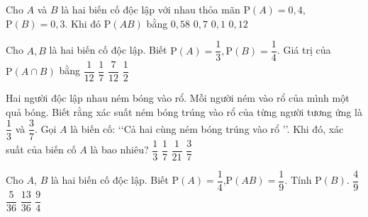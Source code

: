 

\begin{ex}%
	Cho $A$ và $B$ là hai biến cố độc lập với nhau thỏa mãn $\mathrm{P}(A)=0{,}4$,  $\mathrm{P}(B)=0{,}3$. Khi đó $\mathrm{P}(AB)$ bằng
	 \choice
		{$0{,}58$} 
		{$0{,}7$} 
		 {$0{,}1$}
		{\True $0{,}12$} 
\end{ex}

\begin{ex}%
	Cho $A,B$ là hai biến cố độc lập.  Biết $\mathrm{P}(A)=\dfrac{1}{3}, \mathrm{P}(B)=\dfrac{1}{4}$. Giá trị của $\mathrm{P}(A\cap B)$ bằng
	\choice 
		{\True  $\dfrac{1}{12}$}
		{$\dfrac{1}{7}$} 
		{$\dfrac{7}{12}$} 
		 {$\dfrac{1}{2}$}
\end{ex}

\begin{ex}%
	Hai người độc lập nhau ném bóng vào rổ. Mỗi người ném vào rổ của mình một quả bóng. Biết rằng xác suất ném  bóng trúng vào rổ của từng người tương ứng là $\dfrac{1}{3}$ và $\dfrac{3}{7}$. Gọi $A$ là biến cố: \lq\lq Cả hai cùng ném bóng trúng vào rổ \rq\rq. Khi đó, xác suất của biến cố $A$ là bao nhiêu?
	 \choice
		{$\dfrac{1}{3}$} 
		 {\True $\dfrac{1}{7}$}
		{$\dfrac{1}{21}$} 
		 {$\dfrac{3}{7}$}
\end{ex}

\begin{ex}%
	Cho $A$, $B$ là  hai biến cố độc lập. Biết $\mathrm{P}(A) = \dfrac{1}{4}$,$\mathrm{P}(AB) = \dfrac{1}{9}$. Tính $\mathrm{P}(B)$.
	 \choice
		 {\True $\dfrac{4}{9}$}
		{$\dfrac{5}{36}$} 
		 {$\dfrac{13}{36}$}
		 {$\dfrac{9}{4}$}
\end{ex}

